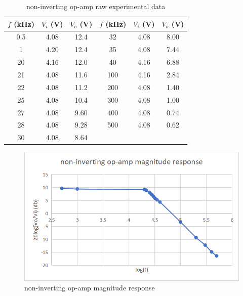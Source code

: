 \documentclass{article}
\begin{document}
\begin{CJK*}{UTF8}{bkai}
\begin{minipage}{0.45\textwidth}
\begin{table}[H]
\begin{tabular}{|c|c|c||c|c|c|}
    \hline
    $f$ (\unit{\kilo\hertz}) &  $V_i$ (V)& $V_o$ (V) & $f$ (\unit{\kilo\hertz}) &  $V_i$ (V)& $V_o$ (V)\\
    \hline\hline
    0.5	& 4.08 & 12.4 & 32  & 4.08 & 8.00   \\
    1   & 4.20 & 12.4 & 35  & 4.08 & 7.44   \\
    20	& 4.16 & 12.0 & 40  & 4.16 & 6.88   \\
    21	& 4.08 & 11.6 & 100 & 4.16 & 2.84   \\
    22	& 4.08 & 11.2 & 200 & 4.08 & 1.40   \\
    25	& 4.08 & 10.4 & 300 & 4.08 & 1.00   \\
    27	& 4.08 & 9.60 & 400 & 4.08 & 0.74   \\
    28	& 4.08 & 9.28 & 500 & 4.08 & 0.62   \\
    30	& 4.08 & 8.64 &     &      &        \\
 \hline
\end{tabular}
\caption{non-inverting op-amp raw experimental data}
\end{table}    
\end{minipage}\hspace{25mm}
\begin{minipage}{0.45\textwidth}
\begin{figure}[H]
    \includegraphics[scale=0.30]{noninv_op_amp.png}
    \caption{non-inverting op-amp magnitude response}
\end{figure}
\end{minipage}


\end{CJK*}
\end{document}

